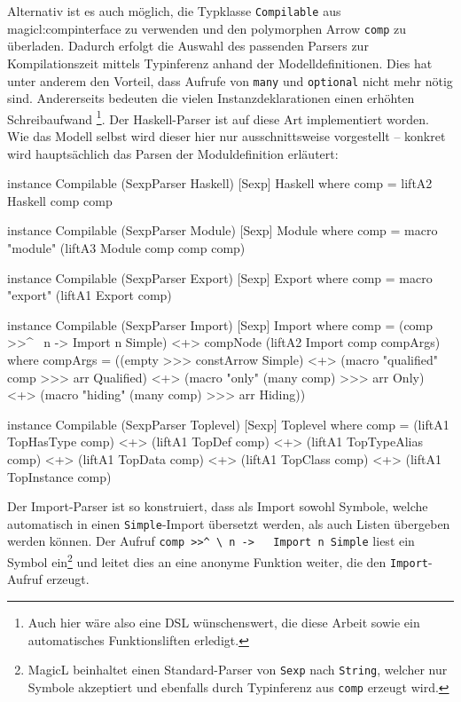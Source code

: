 \documentclass[12pt, a4paper, bibgerm]{scrbook}
\newenvironment{DIFnomarkup}{}{}
\newcommand\icode[1]{\lstinline?#1?}
\newcommand\sref{}
\begin{document}
Alternativ ist es auch möglich, die Typklasse \icode{Compilable} aus
\sref{magicl:compinterface} zu verwenden und den polymorphen
Arrow \icode{comp} zu überladen. Dadurch erfolgt die Auswahl des
passenden Parsers zur Kompilationszeit mittels Typinferenz anhand der
Modelldefinitionen. Dies hat unter anderem den Vorteil, dass Aufrufe von
\icode{many} und \icode{optional} nicht mehr nötig sind. Andererseits
bedeuten die vielen Instanzdeklarationen einen erhöhten Schreibaufwand
\footnote{Auch hier wäre also eine DSL wünschenswert, die diese Arbeit
  sowie ein automatisches Funktionsliften erledigt.}. Der Haskell-Parser
ist auf diese Art implementiert worden. Wie das Modell selbst wird
dieser hier nur ausschnittsweise vorgestellt -- konkret wird
hauptsächlich das Parsen der Moduldefinition erläutert:
\begin{DIFnomarkup}\begin{code}
instance Compilable (SexpParser Haskell) [Sexp] Haskell where
    comp = liftA2 Haskell comp comp

instance Compilable (SexpParser Module) [Sexp] Module where
    comp = macro "module" (liftA3 Module comp comp comp)

instance Compilable (SexpParser Export) [Sexp] Export where
    comp = macro "export" (liftA1 Export comp)

instance Compilable (SexpParser Import) [Sexp] Import where
    comp  = (comp >>^ \ n -> Import n Simple) <+>
             compNode (liftA2 Import comp compArgs)
        where compArgs =
                  ((empty >>> constArrow Simple)               <+>
                   (macro "qualified" comp >>> arr Qualified)  <+>
                   (macro "only" (many comp) >>> arr Only)     <+>
                   (macro "hiding" (many comp) >>> arr Hiding))

instance Compilable (SexpParser Toplevel) [Sexp] Toplevel where
    comp = (liftA1 TopHasType comp)   <+>
           (liftA1 TopDef comp)       <+>
           (liftA1 TopTypeAlias comp) <+>
           (liftA1 TopData comp)      <+>
           (liftA1 TopClass comp)     <+>
           (liftA1 TopInstance comp)
\end{code}\end{DIFnomarkup}
Der Import-Parser ist so konstruiert, dass als Import sowohl Symbole,
welche automatisch in einen \icode{Simple}-Import übersetzt werden, als
auch Listen übergeben werden können. Der Aufruf \icode{comp >>^ \ n ->
  Import n Simple} liest ein Symbol ein\footnote{MagicL beinhaltet einen
Standard-Parser von \icode{Sexp} nach \icode{String}, welcher nur
Symbole akzeptiert und ebenfalls durch Typinferenz aus \icode{comp}
erzeugt wird.} und leitet dies an eine anonyme Funktion weiter, die den
\icode{Import}-Aufruf erzeugt.
\end{document}
